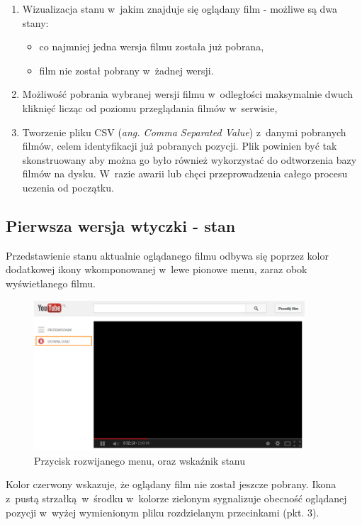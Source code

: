 \begin{enumerate}
    \item Wizualizacja stanu w~jakim znajduje się oglądany film - 
        możliwe są dwa stany:
    \begin{itemize}
        \item co najmniej jedna wersja filmu została już pobrana,
        \item film nie został pobrany w~żadnej wersji.
    \end{itemize}
    \item Możliwość pobrania wybranej wersji filmu w~odległości maksymalnie
        dwuch kliknięć licząc od poziomu przeglądania filmów w~serwisie,
    \item Tworzenie pliku CSV (\textit{ang. Comma Separated Value})
        z~danymi pobranych filmów, celem identyfikacji już pobranych
        pozycji. Plik powinien być tak skonstruowany aby można go było
        również wykorzystać do odtworzenia bazy filmów na dysku. W~razie
        awarii lub chęci przeprowadzenia całego procesu uczenia od
        początku.
\end{enumerate}

\subsection{Pierwsza wersja wtyczki - stan}

Przedstawienie stanu aktualnie oglądanego filmu odbywa się poprzez
kolor dodatkowej ikony wkomponowanej w~lewe pionowe menu, zaraz obok
wyświetlanego filmu.

\begin{figure}[h!]
    \caption{Przycisk rozwijanego menu, oraz wskaźnik stanu}
    \centering
    \includegraphics[width=0.9\textwidth]{img/env_yt_dwn_indicator}
\end{figure}

Kolor czerwony wskazuje, że oglądany film nie został jeszcze pobrany. 
Ikona z~pustą strzałką w~środku w~kolorze zielonym sygnalizuje obecność
oglądanej pozycji w~wyżej wymienionym pliku rozdzielanym przecinkami
(pkt. 3).

